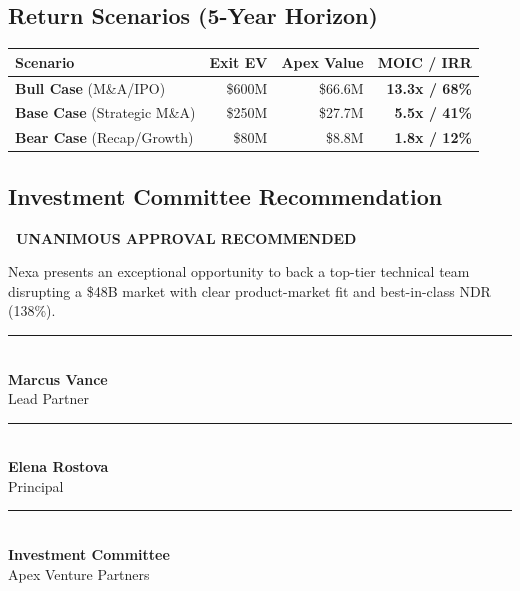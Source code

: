 \documentclass[10pt,a4paper]{article}
\begin{document}
\begin{minipage}[t]{0.52\textwidth}
  \subsection*{Return Scenarios (5-Year Horizon)}
  \small
  \begin{tabularx}{\textwidth}{@{} X r r r @{}}
    \toprule
    \textbf{Scenario} & \textbf{Exit EV} & \textbf{Apex Value} & \textbf{MOIC / IRR} \\
    \midrule
    \textbf{Bull Case} (M\&A/IPO) & \$600M & \$66.6M & \textbf{13.3x / 68\%} \\{}
    \textbf{Base Case} (Strategic M\&A) & \$250M & \$27.7M & \textbf{5.5x / 41\%} \\{}
    \textbf{Bear Case} (Recap/Growth) & \$80M & \$8.8M & \textbf{1.8x / 12\%} \\
    \bottomrule
  \end{tabularx}
\end{minipage}%
\hfill
\begin{minipage}[t]{0.45\textwidth}
  \subsection*{Investment Committee Recommendation}
  \begin{tcolorbox}[enhanced, colback=lightbg, colframe=emerald, arc=4pt, boxrule=1pt, top=6pt, bottom=6pt]
    \small
    \textbf{\color{emerald}\faCheckCircle\ UNANIMOUS APPROVAL RECOMMENDED}

    Nexa presents an exceptional opportunity to back a top-tier technical team disrupting a \$48B market with clear product-market fit and best-in-class NDR (138\%).
  \end{tcolorbox}
\end{minipage}

\vspace{8pt}

\begin{tcolorbox}[enhanced, colback=white, colframe=cardborder, arc=2pt, boxrule=0.5pt, top=6pt, bottom=6pt]
  \centering\small
  \begin{minipage}[t]{0.28\textwidth}
    \centering
    \rule{0.8\textwidth}{0.4pt}\\[2pt]
    \textbf{Marcus Vance}\\ Lead Partner
  \end{minipage}%
  \hfill
  \begin{minipage}[t]{0.28\textwidth}
    \centering
    \rule{0.8\textwidth}{0.4pt}\\[2pt]
    \textbf{Elena Rostova}\\ Principal
  \end{minipage}%
  \hfill
  \begin{minipage}[t]{0.28\textwidth}
    \centering
    \rule{0.8\textwidth}{0.4pt}\\[2pt]
    \textbf{Investment Committee}\\ Apex Venture Partners
  \end{minipage}
\end{tcolorbox}
\end{document}
